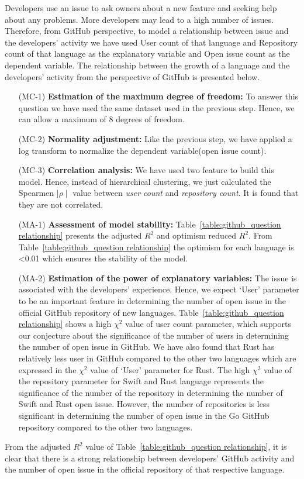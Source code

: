Developers use an issue to ask owners about a new feature and seeking help about any problems. More developers may lead to a high number of issues. Therefore, from GitHub perspective, to model a relationship between issue and the developers' activity we have used User count of that language and Repository count of that language as the explanatory variable and Open issue count as the dependent variable. The relationship between the growth of a language and the developers' activity from the perspective of GitHub is presented below.

\begin{enumerate}[wide=0pt, leftmargin=*]
    \item[(MC-1)] \textbf{Estimation of the maximum degree of freedom:}  To answer this question we have used the same dataset used in the previous step. Hence, we can allow a maximum of 8 degrees of freedom.
    \item[(MC-2)] \textbf{Normality adjustment:} Like the previous step, we have applied a log transform to normalize the dependent variable(open issue count).
    \item[(MC-3)] \textbf{Correlation analysis:}
    We have used two feature to build this model. Hence, instead of hierarchical clustering, we just calculated the Spearmen $\mid \rho \mid$ value between \emph{user count} and \emph{repository count}. It is found that they are not correlated.
    \item[(MA-1)] \textbf{Assessment of model stability:}
    Table~\ref{table:github_question relationship} presents the adjusted $R^2$ and optimism reduced $R^2$. From Table~\ref{table:github_question relationship} the optimism for each language is \textless 0.01 which ensures the stability of the model.
    \item[(MA-2)] \textbf{Estimation of the power of explanatory variables:}
    The issue is associated with the developers' experience. Hence, we expect `User' parameter to be an important feature in determining the number of open issue in the official GitHub repository of new languages. Table~\ref{table:github_question relationship} shows a high $\chi^2$ value of user count parameter, which supports our conjecture about the significance of the number of users in determining the number of open issue in GitHub. We have also found that Rust has relatively less user in GitHub compared to the other two languages which are expressed in the $\chi^2$ value of `User' parameter for Rust. The high $\chi^2$ value of the repository parameter for Swift and Rust language represents the significance of the number of the repository in determining the number of Swift and Rust open issue. However, the number of repositories is less significant in determining the number of open issue in the Go GitHub repository compared to the other two languages.
\end{enumerate}
From the adjusted $R^2$ value of Table~\ref{table:github_question relationship}, it is clear that there is a strong relationship between developers' GitHub activity and the number of open issue in the official repository of that respective language. 

